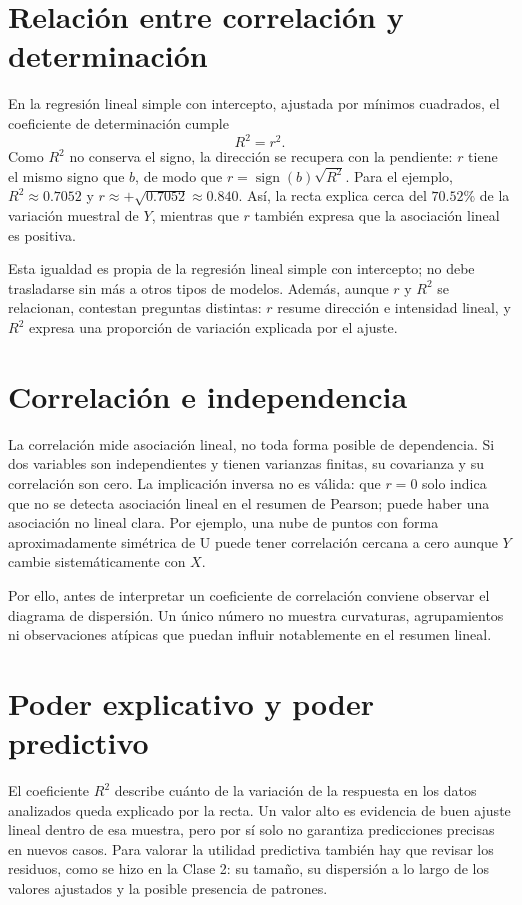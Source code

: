 \section{Relación entre correlación y determinación}

En la regresión lineal simple con intercepto, ajustada por mínimos cuadrados, el coeficiente de determinación cumple
\[
R^2=r^2.
\]
Como $R^2$ no conserva el signo, la dirección se recupera con la pendiente: $r$ tiene el mismo signo que $b$, de modo que $r=\operatorname{sign}(b)\sqrt{R^2}$. Para el ejemplo, $R^2\approx0.7052$ y $r\approx+\sqrt{0.7052}\approx0.840$. Así, la recta explica cerca del $70.52\%$ de la variación muestral de $Y$, mientras que $r$ también expresa que la asociación lineal es positiva.

Esta igualdad es propia de la regresión lineal simple con intercepto; no debe trasladarse sin más a otros tipos de modelos. Además, aunque $r$ y $R^2$ se relacionan, contestan preguntas distintas: $r$ resume dirección e intensidad lineal, y $R^2$ expresa una proporción de variación explicada por el ajuste.

\section{Correlación e independencia}

La correlación mide asociación lineal, no toda forma posible de dependencia. Si dos variables son independientes y tienen varianzas finitas, su covarianza y su correlación son cero. La implicación inversa no es válida: que $r=0$ solo indica que no se detecta asociación lineal en el resumen de Pearson; puede haber una asociación no lineal clara. Por ejemplo, una nube de puntos con forma aproximadamente simétrica de U puede tener correlación cercana a cero aunque $Y$ cambie sistemáticamente con $X$.

Por ello, antes de interpretar un coeficiente de correlación conviene observar el diagrama de dispersión. Un único número no muestra curvaturas, agrupamientos ni observaciones atípicas que puedan influir notablemente en el resumen lineal.

\section{Poder explicativo y poder predictivo}

El coeficiente $R^2$ describe cuánto de la variación de la respuesta en los datos analizados queda explicado por la recta. Un valor alto es evidencia de buen ajuste lineal dentro de esa muestra, pero por sí solo no garantiza predicciones precisas en nuevos casos. Para valorar la utilidad predictiva también hay que revisar los residuos, como se hizo en la Clase 2: su tamaño, su dispersión a lo largo de los valores ajustados y la posible presencia de patrones.


